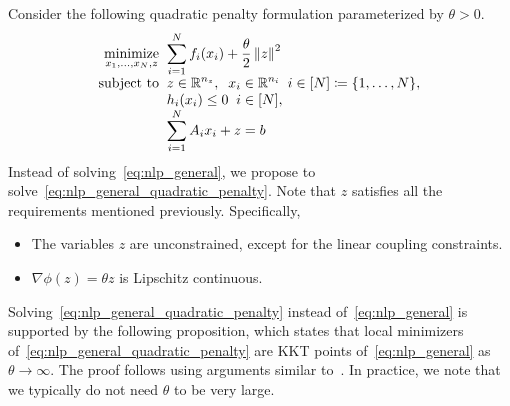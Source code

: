 \documentclass[11pt]{article}
\newcommand{\norm}[1]{\left\lVert #1 \right\rVert}
\begin{document}
Consider the following quadratic penalty formulation parameterized by $\theta > 0$.
\begin{equation}\label{eq:nlp_general_quadratic_penalty}
\begin{array}{r@{\;\;}l}
\displaystyle\mathop{\text{minimize}}_{x_1, \ldots, x_N, z} & \displaystyle \sum_{i = 1}^N f_i(x_i) + \frac{\theta}{2} \norm{z}^2 \\
\text{subject to} & \displaystyle z \in \mathbb{R}^{n_z}, \;\; x_i \in \mathbb{R}^{n_i} \;\; i \in [N] \coloneqq \{1, \ldots, N\}, \\
& \displaystyle h_i(x_i) \leq 0 \;\; i \in [N], \\
& \displaystyle \sum_{i = 1}^N A_i x_i + z = b
\end{array}
\end{equation}
Instead of solving~\eqref{eq:nlp_general}, we propose to solve~\eqref{eq:nlp_general_quadratic_penalty}.
Note that $z$ satisfies all the requirements mentioned previously.
Specifically,
\begin{itemize}
    \item The variables $z$ are unconstrained, except for the linear coupling constraints.
    \item $\nabla \phi(z) = \theta z$ is Lipschitz continuous.
\end{itemize}
Solving~\eqref{eq:nlp_general_quadratic_penalty} instead of~\eqref{eq:nlp_general} is supported by the following proposition, which states that local minimizers of~\eqref{eq:nlp_general_quadratic_penalty} are KKT points of~\eqref{eq:nlp_general} as $\theta \to \infty$.
The proof follows using arguments similar to~\cite[Theorem~17.2]{nocedal2006numerical}.
In practice, we note that we typically do not need $\theta$ to be very large.
\end{document}
